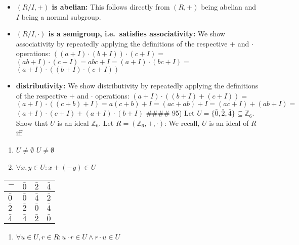 \documentclass[
]{article}
\providecommand{\tightlist}{%
  \setlength{\itemsep}{0pt}\setlength{\parskip}{0pt}}
\begin{document}
\begin{itemize}
\tightlist
\item
  \textbf{\((R/I, +)\) is abelian:} This follows directly from \((R,+)\)
  being abelian and \(I\) being a normal subgroup.
\item
  \textbf{\((R/I, \cdot)\) is a semigroup, i.e.~satisfies
  associativity:} We show associativity by repeatedly applying the
  definitions of the respective \(+\) and \(\cdot\) operations:
  \(((a+I) \cdot (b+I)) \cdot (c+I) =\)
  \((ab + I) \cdot (c+I) = abc + I = (a+I) \cdot (bc + I) =\)
  \((a+I) \cdot ((b+I) \cdot (c+I))\)
\item
  \textbf{distributivity:} We show distributivity by repeatedly applying
  the definitions of the respective \(+\) and \(\cdot\) operations:
  \((a+I) \cdot ((b+I) + (c +I )) =\)
  \((a+I) \cdot ((c+b) + I) = a(c+b) + I = (ac +ab) + I =(ac + I) + (ab + I) =\)
  \((a+I) \cdot (c + I) + (a + I) \cdot (b+I)\) \#\#\#\# 95) Let
  \(U = \{\bar0, \bar2, \bar4\} \subseteq \mathbb{Z}_6\). Show that
  \(U\) is an ideal \(\mathbb{Z}_6\). Let
  \(R = (\mathbb{Z}_6,+,\cdot)\): We recall, \(U\) is an ideal of \(R\)
  iff
\end{itemize}

\begin{enumerate}
\def\labelenumi{\arabic{enumi})}
\tightlist
\item
  \(U \neq \emptyset\) \(U \neq \emptyset\)
\item
  \(\forall x,y \in U: x + (-y) \in U\)
\end{enumerate}

\begin{longtable}[]{@{}llll@{}}
\toprule()
\(-\) & \(\bar 0\) & \(\bar 2\) & \(\bar 4\) \\
\midrule()
\endhead
\(\bar 0\) & \(\bar 0\) & \(\bar 4\) & \(\bar 2\) \\
\(\bar 2\) & \(\bar 2\) & \(\bar 0\) & \(\bar 4\) \\
\(\bar 4\) & \(\bar 4\) & \(\bar 2\) & \(\bar 0\) \\
\bottomrule()
\end{longtable}

\begin{enumerate}
\def\labelenumi{\arabic{enumi})}
\setcounter{enumi}{2}
\tightlist
\item
  \(\forall u \in U, r \in R: u \cdot r \in U \land r \cdot u \in U\)
\end{enumerate}
\end{document}
